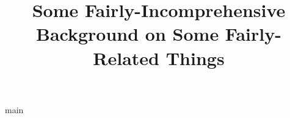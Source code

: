\documentclass[10pt]{article}
\title{Some Fairly-Incomprehensive Background on Some Fairly-Related Things}
\date{}
\author{}
\begin{document}
\maketitle

\tableofcontents
\newpage
{main}

\end{document}
